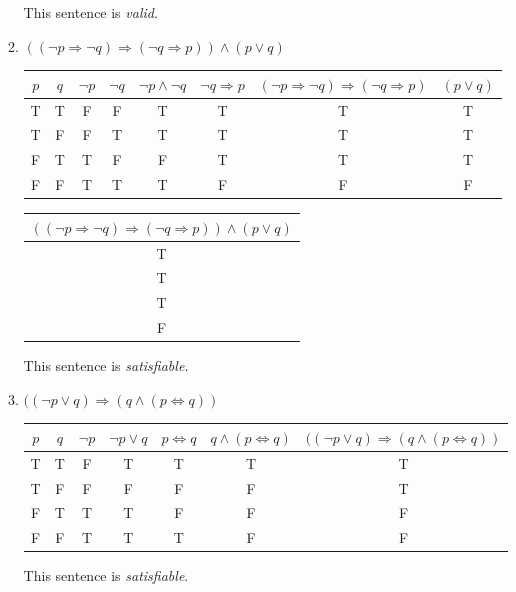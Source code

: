 \documentclass{article}
\begin{document}
\begin{enumerate}
\begin{enumerate}
\begin{tabular}{|c|c|c|c|c|c|c|c|}
					\end{tabular}

					This sentence is \emph{valid}.
			\item $(( \neg p \Rightarrow \neg q) \Rightarrow (\neg q \Rightarrow p)) \wedge (p \vee q)$

				\begin{tabular}{|c|c|c|c|c|c|c|c|}
					\hline
					$p$ & $q$ & $\neg p$ & $ \neg q$ & $ \neg p \wedge \neg q $ & $ \neg q \Rightarrow p $ &
					$( \neg p \Rightarrow \neg q) \Rightarrow (\neg q \Rightarrow p)$ & $(p \vee q)$\\
					\hline
					T & T & F & F & T & T & T & T\\
					\hline
					T & F & F & T & T & T & T & T\\
					\hline
					F & T & T & F & F & T & T & T\\
					\hline
					F & F & T & T & T & F & F & F\\
					\hline
				\end{tabular}

				\begin{tabular}{|c|}
					\hline
					$(( \neg p \Rightarrow \neg q) \Rightarrow (\neg q \Rightarrow p)) \wedge (p \vee q)$ \\
					\hline
					T \\
					\hline
					T \\
					\hline 
					T \\
					\hline
					F \\
					\hline
				\end{tabular}

				This sentence is \emph{satisfiable.}
			\item $((\neg p \vee q) \Rightarrow (q \wedge ( p \Leftrightarrow q))$
			
				\begin{tabular}{|c|c|c|c|c|c|c|}
					\hline
					$p$ & $ q$ & $\neg p$ & $\neg p \vee q$ & 
					$p \Leftrightarrow q$ & $q \wedge (p \Leftrightarrow q)$ & 
					$((\neg p \vee q) \Rightarrow (q \wedge ( p \Leftrightarrow q))$ \\
					\hline
					T & T & F & T & T & T & T\\
					\hline
					T & F & F & F & F & F & T\\
					\hline
					F & T & T& T & F & F & F\\
					\hline
					F & F & T & T & T & F & F\\
					\hline
				\end{tabular}
				This sentence is \emph{satisfiable}.
			

\end{enumerate}
\end{enumerate}
\end{document}
